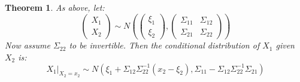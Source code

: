 \documentclass[12pt, a4paper]{article}
\newtheorem{theorem}{Theorem}[section]
\numberwithin{equation}{section}
\begin{document}
\begin{theorem}
As above, let:
\begin{equation}
\begin{pmatrix}
X_1 \\ X_2
\end{pmatrix}
\sim N\left(
\begin{pmatrix}
\xi_1 \\ \xi_2
\end{pmatrix},
\begin{pmatrix}
\Sigma_{11} & \Sigma_{12} \\
\Sigma_{21} & \Sigma_{22}
\end{pmatrix}
\right)
\end{equation}
Now assume $\Sigma_{22}$ to be invertible. Then the conditional distribution of $X_1$ given $X_2$ is:
\begin{equation}
X_1|_{X_2=x_2}\sim N(\xi_1+\Sigma_{12}\Sigma_{22}^{-1}(x_2-\xi_2),\Sigma_{11}-\Sigma_{12}\Sigma_{22}^{-1}\Sigma_{21})
\end{equation}
\end{theorem}
\end{document}
